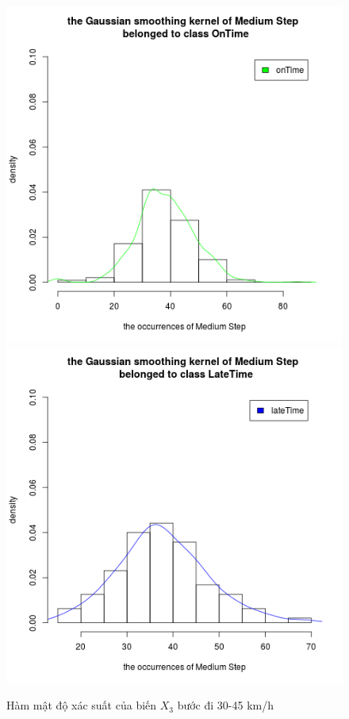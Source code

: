 \documentclass[a4paper, 13pt]{report}
\begin{document}
\FloatBarrier
\begin{figure}[!htb]
  \includegraphics[width=\linewidth]{DensityMediumStep_OnTime}
\endminipage
{}
  \includegraphics[width=\linewidth]{DensityMediumStep_LateTime}
\endminipage
\caption*{Hàm mật độ xác suất của biến $X_3$ bước đi 30-45 km/h}
\end{figure}
\end{document}
